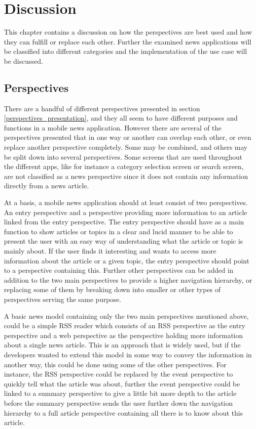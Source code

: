 \chapter{Discussion}
\label{chapter_discussion}
This chapter contains a discussion on how the perspectives are best used and how they can fulfill or replace each other. Further the examined news applications will be classified into different categories and the implementation of the use case will be discussed.

\section{Perspectives}
There are a handful of different perspectives presented in section \ref{perspectives_presentation}, and they all seem to have different purposes and functions in a mobile news application. However there are several of the perspectives presented that in one way or another can overlap each other, or even replace another perspective completely. Some may be combined, and others may be split down into several perspectives. Some screens that are used throughout the different apps, like for instance a category selection screen or search screen, are not classified as a news perspective since it does not contain any information directly from a news article.

At a basis, a mobile news application should at least consist of two perspectives. An entry perspective and a perspective providing more information to an article linked from the entry perspective. The entry perspective should have as a main function to show articles or topics in a clear and lucid manner to be able to present the user with an easy way of understanding what the article or topic is mainly about. If the user finds it interesting and wants to access more information about the article or a given topic, the entry perspective should point to a perspective containing this. Further other perspectives can be added in addition to the two main perspectives to provide a higher navigation hierarchy, or replacing some of them by breaking down into smaller or other types of perspectives serving the same purpose.

A basic news model containing only the two main perspectives mentioned above, could be a simple RSS reader which consists of an RSS perspective as the entry perspective and a web perspective as the perspective holding more information about a single news article. This is an approach that is widely used, but if the developers wanted to extend this model in some way to convey the information in another way, this could be done using some of the other perspectives. For instance, the RSS perspective could be replaced by the event perspective to quickly tell what the article was about, further the event perspective could be linked to a summary perspective to give a little bit more depth to the article before the summary perspective sends the user further down the navigation hierarchy to a full article perspective containing all there is to know about this article.

